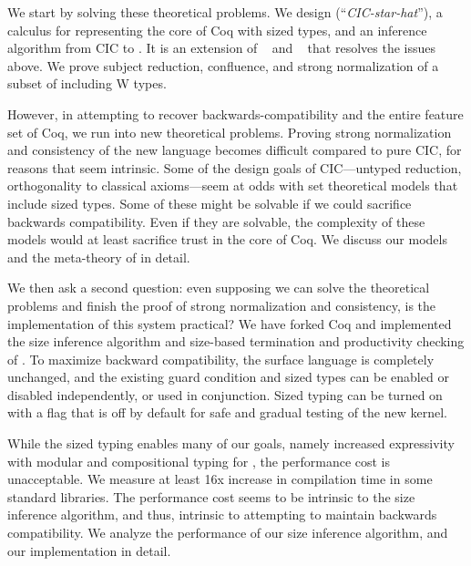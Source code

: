 We start by solving these theoretical problems.
We design \lang (``\emph{CIC-star-hat}''), a calculus for representing the core of Coq with sized types, and an inference algorithm from CIC to \lang.
It is an extension of \CIChat~\citep{cic-hat} and \CIChatminus~\citep{cic-hat-minus} that resolves the issues above.
We prove subject reduction, confluence, and strong normalization of a subset of \lang including W types.

However, in attempting to recover backwards-compatibility and the entire feature set of Coq, we run into new theoretical problems.
Proving strong normalization and consistency of the new language becomes difficult compared to pure CIC, for reasons that seem intrinsic.
Some of the design goals of CIC---untyped reduction, orthogonality to classical axioms---seem at odds with set theoretical models that include sized types.
Some of these might be solvable if we could sacrifice backwards compatibility.
Even if they are solvable, the complexity of these models would at least sacrifice trust in the core of Coq.
We discuss our models and the meta-theory of \lang in detail.

We then ask a second question: even supposing we can solve the theoretical problems and finish the proof of strong normalization and consistency, is the implementation of this system practical?
We have forked Coq\blindimpl\xspace and implemented the size inference algorithm and size-based termination and productivity checking of \lang.
To maximize backward compatibility, the surface language is completely unchanged, and the existing guard condition and sized types can be enabled or disabled independently, or used in conjunction.
Sized typing can be turned on with a flag that is off by default for safe and gradual testing of the new kernel.

While the sized typing enables many of our goals, namely increased expressivity with modular and compositional typing for \cofixpoints, the performance cost is unacceptable.
We measure at least 16x increase in compilation time in some standard libraries.
The performance cost seems to be intrinsic to the size inference algorithm, and thus, intrinsic to attempting to maintain backwards compatibility.
We analyze the performance of our size inference algorithm, and our implementation in detail.

